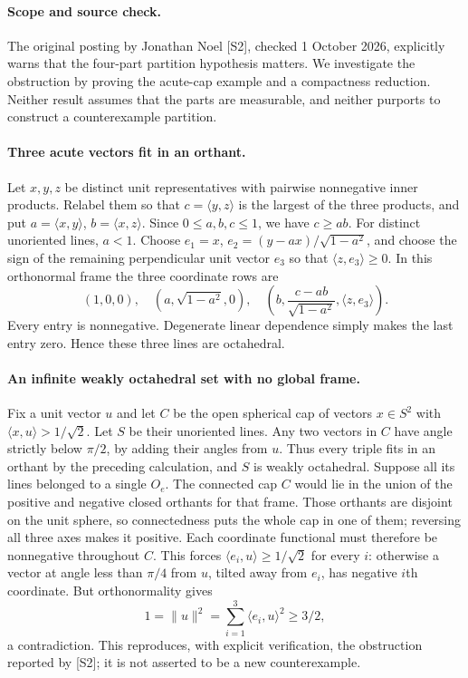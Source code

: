 \documentclass[11pt,a4paper]{article}
\begin{document}
\paragraph{Scope and source check.}
The original posting by Jonathan Noel [S2], checked 1 October 2026, explicitly
warns that the four-part partition hypothesis matters. We investigate the
obstruction by proving the acute-cap example and a compactness reduction.
Neither result assumes that the parts are measurable, and neither purports
to construct a counterexample partition.

\paragraph{Three acute vectors fit in an orthant.}
Let $x,y,z$ be distinct unit representatives with pairwise nonnegative inner
products. Relabel them so that $c=\langle y,z\rangle$ is the largest of the
three products, and put $a=\langle x,y\rangle$, $b=\langle x,z\rangle$.
Since $0\le a,b,c\le1$, we have $c\ge ab$. For distinct unoriented lines,
$a<1$. Choose $e_1=x$, $e_2=(y-ax)/\sqrt{1-a^2}$, and choose the sign of the
remaining perpendicular unit vector $e_3$ so that $\langle z,e_3\rangle\ge0$.
In this orthonormal frame the three coordinate rows are
\[
 (1,0,0),\quad(a,\sqrt{1-a^2},0),\quad
 \left(b,\frac{c-ab}{\sqrt{1-a^2}},\langle z,e_3\rangle\right).
\]
Every entry is nonnegative. Degenerate linear dependence simply makes the
last entry zero. Hence these three lines are octahedral.

\paragraph{An infinite weakly octahedral set with no global frame.}
Fix a unit vector $u$ and let $C$ be the open spherical cap of vectors
$x\in S^2$ with $\langle x,u\rangle>1/\sqrt2$. Let $S$ be their unoriented
lines. Any two vectors in $C$ have angle strictly below $\pi/2$, by adding
their angles from $u$. Thus every triple fits in an orthant by the preceding
calculation, and $S$ is weakly octahedral.
Suppose all its lines belonged to a single $O_e$. The connected cap $C$
would lie in the union of the positive and negative closed orthants for
that frame. Those orthants are disjoint on the unit sphere, so connectedness
puts the whole cap in one of them; reversing all three axes makes it positive.
Each coordinate functional must therefore be nonnegative throughout $C$.
This forces $\langle e_i,u\rangle\ge1/\sqrt2$ for every $i$: otherwise a vector
at angle less than $\pi/4$ from $u$, tilted away from $e_i$, has negative
$i$th coordinate. But orthonormality gives
\[
 1=\|u\|^2=\sum_{i=1}^3\langle e_i,u\rangle^2\ge3/2,
\]
a contradiction. This reproduces, with explicit verification, the obstruction
reported by [S2]; it is not asserted to be a new counterexample.
\end{document}
